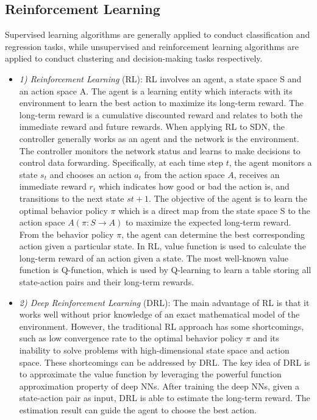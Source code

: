 \subsection{Reinforcement Learning}
Supervised learning algorithms are generally applied to conduct classification and regression tasks, while unsupervised and reinforcement learning algorithms are applied to conduct clustering and decision-making tasks respectively.
\begin{itemize}
\item[]\textit{1)	Reinforcement Learning} (RL): RL \cite{Sutton2018, Kaelbling1996} involves an agent, a state space S and an action space A. The agent is a learning entity which interacts with its environment to learn the best action to maximize its long-term reward. The long-term reward is a cumulative discounted reward and relates to both the immediate reward and future rewards. When applying RL to SDN, the controller generally works as an agent and the network is the environment. The controller monitors the network status and learns to make decisions to control data forwarding. Specifically, at each time step $t$, the agent monitors a state $s_{t}$ and chooses an action $a_{t}$ from the action space $A$, receives an immediate reward $r_{t}$ which indicates how good or bad the action is, and transitions to the next state $st+1$. The objective of the agent is to learn the optimal behavior policy $\pi$ which is a direct map from the state space S to the action space $A (\pi : S \longrightarrow A)$ to maximize the expected long-term reward. From the behavior policy $\pi$, the agent can determine the best corresponding action given a particular state. In RL, value function is used to calculate the long-term reward of an action given a state. The most well-known value function is Q-function, which is used by Q-learning to learn a table storing all state-action pairs and their long-term rewards.
\item[]\textit{2)	Deep Reinforcement Learning} (DRL): The main advantage of RL is that it works well without prior knowledge of an exact mathematical model of the environment. However, the traditional RL approach has some shortcomings, such as low convergence rate to the optimal behavior policy $\pi$ and its inability to solve problems with high-dimensional state space and action space. These shortcomings can be addressed by DRL. The key idea of DRL is to approximate the value function by leveraging the powerful function approximation property of deep NNs. After training the deep NNs, given a state-action pair as input, DRL is able to estimate the long-term reward. The estimation result can guide the agent to choose the best action.

\end{itemize}
